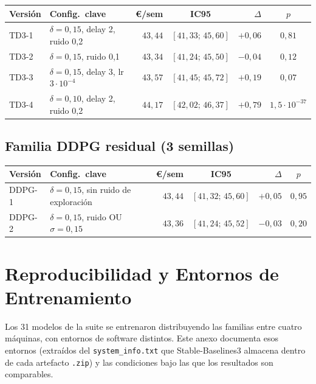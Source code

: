 \documentclass[12pt, a4paper, twoside]{report}
\begin{document}
\begin{table}[H]
\centering\small
\begin{tabular}{llrcrc}
\toprule
\textbf{Versión} & \textbf{Config.\ clave} & \textbf{€/sem} & \textbf{IC95} &
\textbf{$\Delta$} & \textbf{$p$} \\
\midrule
TD3-1 & $\delta{=}0{,}15$, delay 2, ruido 0{,}2 & $43{,}44$ & $[41{,}33;\,45{,}60]$ & $+0{,}06$ & $0{,}81$ \\
TD3-2 & $\delta{=}0{,}15$, ruido 0{,}1 & $43{,}34$ & $[41{,}24;\,45{,}50]$ & $-0{,}04$ & $0{,}12$ \\
TD3-3 & $\delta{=}0{,}15$, delay 3, lr $3\cdot10^{-4}$ & $43{,}57$ & $[41{,}45;\,45{,}72]$ & $+0{,}19$ & $0{,}07$ \\
TD3-4 & $\delta{=}0{,}10$, delay 2, ruido 0{,}2 & $44{,}17$ & $[42{,}02;\,46{,}37]$ & $+0{,}79$ & $1{,}5\cdot10^{-37}$ \\
\bottomrule
\end{tabular}
\end{table}

\section{Familia DDPG residual (3 semillas)}

\begin{table}[H]
\centering\small
\begin{tabular}{llrcrc}
\toprule
\textbf{Versión} & \textbf{Config.\ clave} & \textbf{€/sem} & \textbf{IC95} &
\textbf{$\Delta$} & \textbf{$p$} \\
\midrule
DDPG-1 & $\delta{=}0{,}15$, sin ruido de exploración & $43{,}44$ & $[41{,}32;\,45{,}60]$ & $+0{,}05$ & $0{,}95$ \\
DDPG-2 & $\delta{=}0{,}15$, ruido OU $\sigma{=}0{,}15$ & $43{,}36$ & $[41{,}24;\,45{,}52]$ & $-0{,}03$ & $0{,}20$ \\
\bottomrule
\end{tabular}
\end{table}

\chapter{Reproducibilidad y Entornos de Entrenamiento}
\label{app:reproducibilidad}

Los 31 modelos de la suite se entrenaron distribuyendo las familias entre
cuatro máquinas, con entornos de software distintos. Este anexo documenta esos
entornos (extraídos del \texttt{system\_info.txt} que Stable-Baselines3
almacena dentro de cada artefacto \texttt{.zip}) y las condiciones bajo las
que los resultados son comparables.
\end{document}

